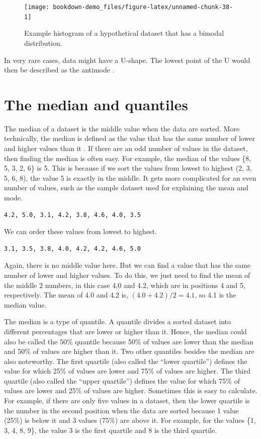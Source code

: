 \documentclass[
  openany]{krantz}
\begin{document}
\begin{figure}
\texttt{[image: bookdown-demo\_files/figure-latex/unnamed-chunk-38-1]} \caption{Example histogram of a hypothetical dataset that has a bimodal distribution.}\label{fig:unnamed-chunk-38}
\end{figure}

In very rare cases, data might have a U-shape.
The lowest point of the U would then be described as the antimode \citep{Sokal1995}.

\hypertarget{the-median-and-quantiles}{%
\section{The median and quantiles}\label{the-median-and-quantiles}}

The median of a dataset is the middle value when the data are sorted.
More technically, the median is defined as the value that has the same number of lower and higher values than it \citep{Sokal1995}.
If there are an odd number of values in the dataset, then finding the median is often easy.
For example, the median of the values \{8, 5, 3, 2, 6\} is 5.
This is because if we sort the values from lowest to highest (2, 3, 5, 6, 8), the value 5 is exactly in the middle.
It gets more complicated for an even number of values, such as the sample dataset used for explaining the mean and mode.

\begin{verbatim}
4.2, 5.0, 3.1, 4.2, 3.8, 4.6, 4.0, 3.5
\end{verbatim}

We can order these values from lowest to highest.

\begin{verbatim}
3.1, 3.5, 3.8, 4.0, 4.2, 4.2, 4.6, 5.0
\end{verbatim}

Again, there is no middle value here.
But we can find a value that has the same number of lower and higher values.
To do this, we just need to find the mean of the middle 2 numbers, in this case 4.0 and 4.2, which are in positions 4 and 5, respectively.
The mean of 4.0 and 4.2 is, \((4.0 + 4.2)/2 = 4.1\), so 4.1 is the median value.

The median is a type of quantile.
A quantile divides a sorted dataset into different percentages that are lower or higher than it.
Hence, the median could also be called the 50\% quantile because 50\% of values are lower than the median and 50\% of values are higher than it.
Two other quantiles besides the median are also noteworthy.
The first quartile (also called the ``lower quartile'') defines the value for which 25\% of values are lower and 75\% of values are higher.
The third quartile (also called the ``upper quartile'') defines the value for which 75\% of values are lower and 25\% of values are higher.
Sometimes this is easy to calculate.
For example, if there are only five values in a dataset, then the lower quartile is the number in the second position when the data are sorted because 1 value (25\%) is below it and 3 values (75\%) are above it.
For example, for the values \{1, 3, 4, 8, 9\}, the value 3 is the first quartile and 8 is the third quartile.
\end{document}
